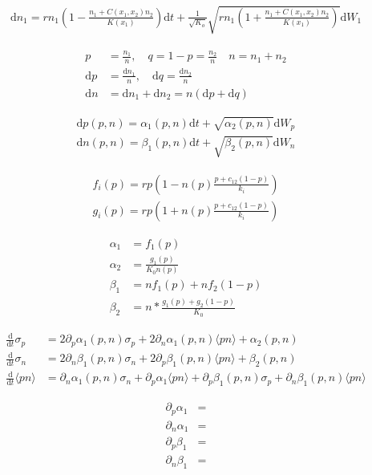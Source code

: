 \documentclass[letterpaper,10pt]{article}
\title{}
\author{Carl Boettiger}
\newcommand{\ud}{\mathrm{d}}
\begin{document}
\maketitle

\begin{align*}
\ud n_1 = r n_1 \left(1 -  \frac{n_1 + C(x_1, x_2) n_2}{K(x_1) } \right) \ud t + \frac{1}{\sqrt{K_o} } \sqrt{r n_1 \left(1 +  \frac{n_1 + C(x_1, x_2) n_2}{K(x_1) } \right) } \ud W_1
\end{align*}

\begin{align*}
p &= \frac{n_1}{n}, \quad q = 1-p = \frac{n_2}{n} \quad n = n_1 + n_2 \\
\ud p &= \frac{\ud n_1}{n}, \quad \ud q = \frac{\ud n_2}{n} \\
\ud n &= \ud n_1 + \ud n_2 = n (\ud p + \ud q) 
\end{align*}

\begin{align*}
\ud p(p,n) = \alpha_1(p,n) \ud t + \sqrt{ \alpha_2(p,n) } \ud W_p \\
\ud n(p,n) = \beta_1(p,n) \ud t +  \sqrt{ \beta_2(p,n) } \ud W_n
\end{align*}

\begin{align*}
f_i(p) =  r p \left(1 -  n(p) \frac{p + c_{12}(1-p) }{k_i } \right) \\
g_i(p) =  r p \left(1 +  n(p) \frac{p + c_{12}(1-p) }{k_i } \right) 
\end{align*}

\begin{align*}
\alpha_1 &=  f_1(p) \\ 
\alpha_2 &= \frac{ g_1(p) }{K_0 n(p) } \\
\beta_1 &= n f_1(p) + n f_2(1-p)  \\
\beta_2 &= n*\frac{g_1(p)+g_2(1-p)}{K_0 } 
\end{align*}


\begin{align*}
\frac{\ud}{\ud t} \sigma_p &= 2 \partial_p \alpha_1(p,n) \sigma_p  +2\partial_n\alpha_1(p,n) \langle p n \rangle +  \alpha_2(p,n) \\
\frac{\ud }{\ud t} \sigma_n&= 2 \partial_n \beta_1(p,n) \sigma_n  +2\partial_p\beta_1(p,n) \langle p n \rangle +  \beta_2(p,n) \\
\frac{\ud }{\ud t} \langle p n \rangle &= \partial_n \alpha_1(p,n) \sigma_n  +\partial_p \alpha_1 \langle pn \rangle + \partial_p\beta_1 (p,n) \sigma_p + \partial_n \beta_1(p,n) \langle p n \rangle
\end{align*}


\begin{align*}
\partial_p \alpha_1 &= 
\\ \partial_n \alpha_1 &=
\\ \partial_p \beta_1 &= 
\\ \partial_n \beta_1 &=
\end{align*}
\end{document}
